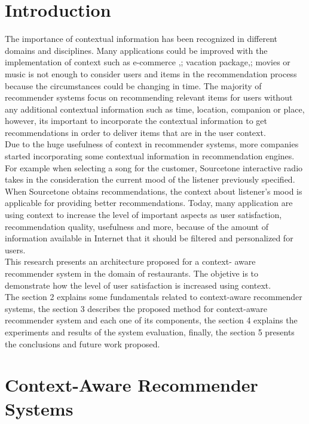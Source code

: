 \section{Introduction} \label{intro} 

The importance of contextual information has been recognized in different
domains and disciplines. Many applications could be improved with the
implementation of context such as e-commerce
\cite{bulander2005enabling},\cite{schafer1999recommender}; vacation
package\cite{liu2011personalized},\cite{liu2014cocktail};
movies\cite{eyjolfsdottir2010moviegen}   or music\cite{baltrunas2011incarmusic}
is not enough to consider users and items in the recommendation process because
the circumstances could be changing in time. The majority of recommender systems
focus on recommending relevant items for users without any additional contextual
information such as time, location, companion or place, however, its important
to incorporate the contextual information to get recommendations in order to
deliver items that are in the user context. \\   Due to the huge usefulness of
context in recommender systems, more companies started incorporating some
contextual information in recommendation engines.  For example when selecting a
song for the customer, Sourcetone interactive radio\cite{huq2010automated} takes
in the consideration the current mood of the listener previously specified. When
Sourcetone obtains recommendations, the context about listener’s mood is
applicable for providing better recommendations.   Today, many application are
using context to increase the level of important aspects as user satisfaction,
recommendation quality, usefulness and more, because of the amount of
information available in Internet that it should be filtered and personalized
for users.\\  This research presents an architecture proposed for a context-
aware recommender system in the domain of restaurants. The objetive is to
demonstrate how the level of user satisfaction is increased using context.\\ The
section 2 explains some fundamentals related to context-aware recommender
systems, the section 3 describes the proposed method for context-aware
recommender system and each one of its components, the section 4 explains the
experiments  and results of the system evaluation, finally, the section 5
presents the conclusions and future work proposed.

\section{Context-Aware Recommender Systems } \label{sec:2} 
